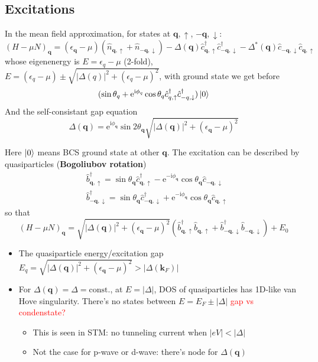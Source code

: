 \documentclass[11pt,letterpaper]{article}
\numberwithin{equation}{section} %
\renewcommand*{\vec}[1]{\bm{#1}}
\newcommand\mi{\mathrm{i}}
\newcommand\e{\mathrm{e}}
\newcommand{\spind}{\ensuremath{\downarrow}}
\newcommand{\spinu}{\ensuremath{\uparrow}}
\begin{document}
\subsection{Excitations}
\label{sub:excitations}
In the mean field approximation, for states at $\vec q, \spinu$, $-\vec q,
\spind$: 
\begin{equation}
	(H-\mu N)_{\vec q} = (\epsilon_{\vec q} - \mu)(\hat n_{\vec q,\spinu} + 
	\hat n_{-\vec q, \spind}) - \Delta(\vec q)\hat c_{\vec q,\spinu}^\dagger
	\hat c_{-\vec q,\spind}^\dagger - \Delta^*(\vec q) \hat c_{-\vec q,\spind}
	\hat c_{\vec q, \spinu}
\end{equation}
whose eigenenergy is $E = \epsilon_q - \mu$ (2-fold), $E = (\epsilon_q-\mu)
\pm \sqrt{|\Delta(q)|^2+(\epsilon_q-\mu)^2}$, with ground state we get before
\begin{equation}
	(\sin\theta_q + \e^{\mi\phi_q}\cos\theta_q \hat c_{q,\spinu}^\dagger
	\hat c_{-q,\spind}^\dagger)\ket{0}
\end{equation}
And the self-consistant gap equation
\begin{equation}\label{eq:pari_gap_in_exci}
	\Delta(\vec q) = \e^{\mi\phi_{\vec q}}\sin 2\theta_{\vec q}\sqrt{
	|\Delta(\vec q)|^2+(\epsilon_{\vec q}-\mu)^2}
\end{equation}

Here $\ket 0$ means BCS ground state at other $\vec q$. The excitation can be
described by quasiparticles (\textbf{Bogoliubov rotation})
\begin{align}
	& \hat b_{\vec q, \spinu}^\dagger = \sin\theta_{\vec q}\hat c_{\vec q, \spinu}^\dagger
	-\e^{-\mi\phi_{\vec q}}\cos\theta_{\vec q}\hat c_{-\vec q,\spind} \\
	& \hat b_{-\vec q, \spind}^\dagger = \sin\theta_{\vec q}\hat c_{-\vec q,
	\spind}^\dagger	+\e^{-\mi\phi_{\vec q}}\cos\theta_{\vec q}\hat c_{\vec q,\spinu} 
\end{align}
so that 
\begin{equation}
	(H-\mu N)_{\vec q} = \sqrt{|\Delta(\vec q)|^2 + (\epsilon_{\vec q}
	-\mu)^2} \left( \hat b_{\vec q,\spinu}^\dagger\hat b_{\vec q,\spinu} + 
	\hat b_{-\vec q,\spind}^\dagger \hat b_{-\vec q,\spind}\right) + E_0
\end{equation}
\begin{itemize}
	\item The quasiparticle energy/excitation gap $E_{q} = \sqrt{|\Delta(\vec
		q)|^2 + (\epsilon_{\vec q} -\mu)^2} >|\Delta(\vec k_F)|$
	\item For $\Delta(\vec q) = \Delta = \mbox{const.}$, at $E=|\Delta|$, DOS
		of quasiparticles has 1D-like van Hove singularity. There's no states
		between $E = E_F \pm |\Delta|$ \textcolor{red}{gap vs condenstate?}
		\begin{itemize}
		  \item This is seen in STM: no tunneling current when
			  $|eV|<|\Delta|$
		  \item Not the case for p-wave or d-wave: there's node for
			  $\Delta(\vec q)$
		\end{itemize}
\end{itemize}
\end{document}
